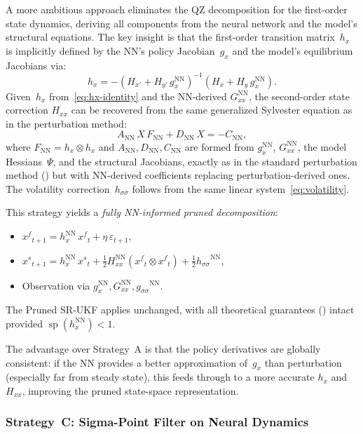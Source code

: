 \documentclass[12pt,a4paper]{article}
\newcommand{\kron}{\otimes}
\newcommand{\xf}{{x^{f}}}
\newcommand{\xs}{{x^{s}}}
\newcommand{\gx}{g_x}
\newcommand{\hx}{h_x}
\newcommand{\Gxx}{G_{xx}}
\newcommand{\Hxx}{H_{xx}}
\newcommand{\gss}{{g_{\sigma\sigma}}}
\newcommand{\hsig}{{h_{\sigma\sigma}}}
\DeclareMathOperator{\specrad}{sp}
\begin{document}
A more ambitious approach eliminates the QZ decomposition for the
first-order state dynamics, deriving all components from the neural
network and the model's structural equations. The key insight is
that the first-order transition matrix~$\hx$ is implicitly defined
by the NN's policy Jacobian~$\gx$ and the model's equilibrium
Jacobians via:
\begin{equation}\label{eq:hx-identity}
\hx = -(H_{x'} + H_{y'}\,\gx^{\mathrm{NN}})^{-1}
  (H_x + H_y\,\gx^{\mathrm{NN}}).
\end{equation}
Given~$\hx$ from~\eqref{eq:hx-identity} and the NN-derived
$\Gxx^{\mathrm{NN}}$, the second-order state correction $\Hxx$
can be recovered from the same generalized Sylvester equation
as in the perturbation method:
\begin{equation}\label{eq:sylvester-nn}
A_{\mathrm{NN}}\,X\,F_{\mathrm{NN}} + D_{\mathrm{NN}}\,X = -C_{\mathrm{NN}},
\end{equation}
where $F_{\mathrm{NN}} = \hx \kron \hx$ and
$A_{\mathrm{NN}}, D_{\mathrm{NN}}, C_{\mathrm{NN}}$ are formed
from $\gx^{\mathrm{NN}}$, $\Gxx^{\mathrm{NN}}$, the model
Hessians~$\Psi$, and the structural Jacobians, exactly as in the
standard perturbation method () but with
NN-derived coefficients replacing perturbation-derived ones.
The volatility correction~$\hsig$ follows from the same linear
system~\eqref{eq:volatility}.

This strategy yields a \emph{fully NN-informed pruned decomposition}:
\begin{itemize}[nosep]
\item $\xf_{t+1} = \hx^{\mathrm{NN}}\,\xf_t + \eta\,\varepsilon_{t+1}$,
\item $\xs_{t+1} = \hx^{\mathrm{NN}}\,\xs_t
+ \tfrac{1}{2}\Hxx^{\mathrm{NN}}(\xf_t \kron \xf_t)
+ \tfrac{1}{2}\hsig^{\mathrm{NN}}$,
\item Observation via $\gx^{\mathrm{NN}}, \Gxx^{\mathrm{NN}}, \gss^{\mathrm{NN}}$.
\end{itemize}
The Pruned SR-UKF applies unchanged, with all theoretical
guarantees () intact provided
$\specrad(\hx^{\mathrm{NN}}) < 1$.

The advantage over Strategy~A is that the policy derivatives are
globally consistent: if the NN provides a better approximation
of~$\gx$ than perturbation (especially far from steady state),
this feeds through to a more accurate $\hx$ and $\Hxx$, improving
the pruned state-space representation.

\subsubsection{Strategy~C: Sigma-Point Filter on Neural Dynamics}
\end{document}

